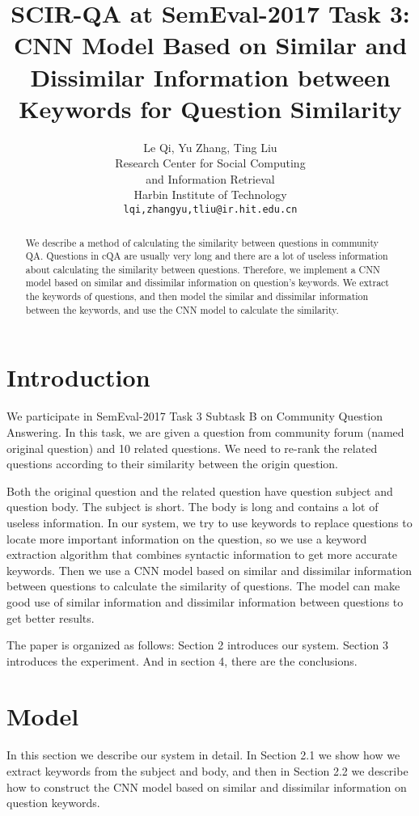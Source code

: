 \documentclass[11pt,a4paper]{article}
\title{SCIR-QA at SemEval-2017 Task 3: CNN Model Based on Similar and Dissimilar Information between Keywords for Question Similarity}
\author{Le Qi, Yu Zhang, Ting Liu\\
  Research Center for Social Computing\\
  and Information Retrieval \\
  Harbin Institute of Technology\\
  {\tt lqi,zhangyu,tliu@ir.hit.edu.cn} \\}
\date{}
\begin{document}
\maketitle
\begin{abstract}
  We describe a method of calculating the similarity between questions in community QA. Questions in cQA are usually very long and there are a lot of useless information about calculating the similarity between questions. Therefore, we implement a CNN model based on similar and dissimilar information on question’s keywords. We extract the keywords of questions, and then model the similar and dissimilar information between the keywords, and use the CNN model to calculate the similarity.
\end{abstract}

\section{Introduction}

We participate in SemEval-2017 Task 3 Subtask B \cite{SemEval-2017:task3} on Community Question Answering. In this task, we are given a question from community forum (named original question) and 10 related questions. We need to re-rank the related questions according to their similarity between the origin question. 

Both the original question and the related question have question subject and question body. The subject is short. The body is long and contains a lot of useless information. In our system, we try to use keywords to replace questions to locate more important information on the question, so we use a keyword extraction algorithm that combines syntactic information to get more accurate keywords. Then we use a CNN model based on similar and dissimilar information between questions to calculate the similarity of questions. The model can make good use of similar information and dissimilar information between questions to get better results.

The paper is organized as follows: Section 2 introduces our system. Section 3 introduces the experiment. And in section 4, there are the conclusions.


\section{Model}

In this section we describe our system in detail. In Section 2.1 we show how we extract keywords from the subject and body, and then in Section 2.2 we describe how to construct the CNN model based on similar and dissimilar information on question keywords.
\end{document}

